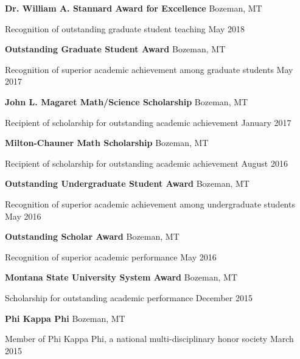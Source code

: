 \documentclass[a4paper]{article}
\begin{document}
\vspace*{2mm}

\textbf{Dr. William A. Stannard Award for Excellence} \hfill Bozeman, MT

Recognition of outstanding graduate student teaching \hfill May 2018

\vspace*{2mm}

\textbf{Outstanding Graduate Student Award} \hfill Bozeman, MT

Recognition of superior academic achievement among graduate students
\hfill May 2017

\vspace*{2mm}

\textbf{John L. Magaret Math/Science Scholarship} \hfill Bozeman, MT

Recipient of scholarship for outstanding academic achievement
\hfill January 2017

\vspace*{2mm}

\textbf{Milton-Chauner Math Scholarship} \hfill Bozeman, MT

Recipient of scholarship for outstanding academic achievement
\hfill August 2016

\vspace*{2mm}

\textbf{Outstanding Undergraduate Student Award} \hfill Bozeman, MT

Recognition of superior academic achievement among undergraduate
students \hfill May 2016

\vspace*{2mm}

\textbf{Outstanding Scholar Award} \hfill Bozeman, MT

Recognition of superior academic performance \hfill May 2016

\vspace*{2mm}

\textbf{Montana State University System Award} \hfill Bozeman, MT

Scholarship for outstanding academic performance \hfill December 2015

\vspace*{2mm}

\textbf{Phi Kappa Phi} \hfill Bozeman, MT

Member of Phi Kappa Phi, a national multi-disciplinary honor society
\hfill March 2015

\vspace*{2mm}
\end{document}
